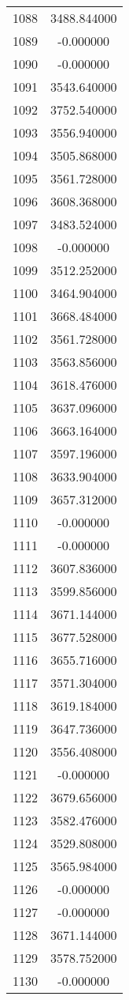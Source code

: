 \documentclass[12pt]{article}
\begin{document}
\begin{longtable}{@{}cc@{}}
1088 & 3488.844000 \\
1089 & -0.000000 \\
1090 & -0.000000 \\
1091 & 3543.640000 \\
1092 & 3752.540000 \\
1093 & 3556.940000 \\
1094 & 3505.868000 \\
1095 & 3561.728000 \\
1096 & 3608.368000 \\
1097 & 3483.524000 \\
1098 & -0.000000 \\
1099 & 3512.252000 \\
1100 & 3464.904000 \\
1101 & 3668.484000 \\
1102 & 3561.728000 \\
1103 & 3563.856000 \\
1104 & 3618.476000 \\
1105 & 3637.096000 \\
1106 & 3663.164000 \\
1107 & 3597.196000 \\
1108 & 3633.904000 \\
1109 & 3657.312000 \\
1110 & -0.000000 \\
1111 & -0.000000 \\
1112 & 3607.836000 \\
1113 & 3599.856000 \\
1114 & 3671.144000 \\
1115 & 3677.528000 \\
1116 & 3655.716000 \\
1117 & 3571.304000 \\
1118 & 3619.184000 \\
1119 & 3647.736000 \\
1120 & 3556.408000 \\
1121 & -0.000000 \\
1122 & 3679.656000 \\
1123 & 3582.476000 \\
1124 & 3529.808000 \\
1125 & 3565.984000 \\
1126 & -0.000000 \\
1127 & -0.000000 \\
1128 & 3671.144000 \\
1129 & 3578.752000 \\
1130 & -0.000000 \\

\end{longtable}
\end{document}
